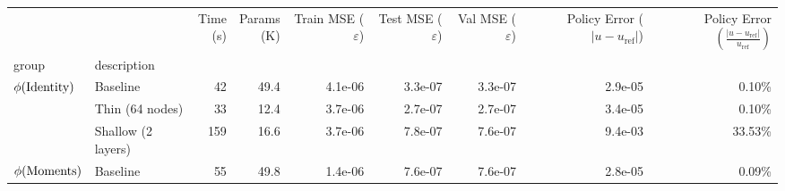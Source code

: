 \begin{tabular}{llrrrrrrr}
\toprule
                         &                  & \shortstack{Time \\ (s)} & \shortstack{Params\\ (K)} & \shortstack{Train MSE \\ ($\varepsilon$)} & \shortstack{Test MSE \\ ($\varepsilon$)} & \shortstack{Val MSE \\ ($\varepsilon$)} & \shortstack{Policy Error \\ ($|u - u_{\text{ref}}|$)} & \shortstack{Policy Error\\ $\left(\frac{|u - u_{\text{ref}}|}{u_{\text{ref}}}\right)$} \\
group & description &                          &                           &                                           &                                          &                                         &                                                       &                                                                                        \\
\midrule
\multirow{3}{*}{$\phi(\textup{Identity})$} & Baseline &                       42 &                      49.4 &                                   4.1e-06 &                                  3.3e-07 &                                 3.3e-07 &                                            2.9e-05 &                                             0.10\% \\
                         & Thin (64 nodes) &                       33 &                      12.4 &                                   3.7e-06 &                                  2.7e-07 &                                 2.7e-07 &                                            3.4e-05 &                                             0.10\% \\
                         & Shallow (2 layers) &                      159 &                      16.6 &                                   3.7e-06 &                                  7.8e-07 &                                 7.6e-07 &                                            9.4e-03 &                                            33.53\% \\
\cline{1-9}
\multirow{7}{*}{$\phi(\textup{Moments})$} & Baseline &                       55 &                      49.8 &                                   1.4e-06 &                                  7.6e-07 &                                 7.6e-07 &                                            2.8e-05 &                                             0.09\% \\

\end{tabular}
